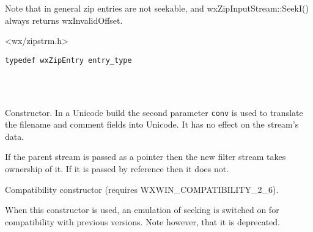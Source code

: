 Note that in general zip entries are not seekable, and
wxZipInputStream::SeekI() always returns wxInvalidOffset.




<wx/zipstrm.h>



\begin{verbatim}
typedef wxZipEntry entry_type
\end{verbatim}


\\
\\



\label{wxzipinputstreamwxzipinputstream}



Constructor. In a Unicode build the second parameter {\tt conv} is
used to translate the filename and comment fields into Unicode. It has
no effect on the stream's data.

If the parent stream is passed as a pointer then the new filter stream
takes ownership of it. If it is passed by reference then it does not.


Compatibility constructor (requires WXWIN\_COMPATIBILITY\_2\_6).

When this constructor is used, an emulation of seeking is
switched on for compatibility with previous versions. Note however,
that it is deprecated.


\label{wxzipinputstreamcloseentry}


